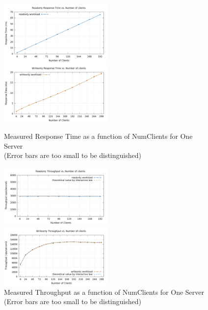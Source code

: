\begin{figure}[!h]
\parbox{.5\linewidth}{
\centering
\includegraphics[width=0.5\textwidth]{img/2_1_responsetime_readonly.png}
}
\parbox{.5\linewidth}{
\centering
\includegraphics[width=0.5\textwidth]{img/2_1_responsetime_writeonly.png}
}
\captionsetup{justification=centering}
\caption{\label{fig:2.1_responsetime}Measured Response Time as a function of NumClients for One Server \\(Error bars are too small to be distinguished)}

\parbox{.5\linewidth}{
\centering
\includegraphics[width=0.5\textwidth]{img/2_1_throughput_readonly.png}
}
\parbox{.5\linewidth}{
\centering
\includegraphics[width=0.5\textwidth]{img/2_1_throughput_writeonly.png}
}
\captionsetup{justification=centering}
\caption{\label{fig:2.1_throughput}Measured Throughput as a function of NumClients for One Server \\(Error bars are too small to be distinguished)}
\end{figure}

